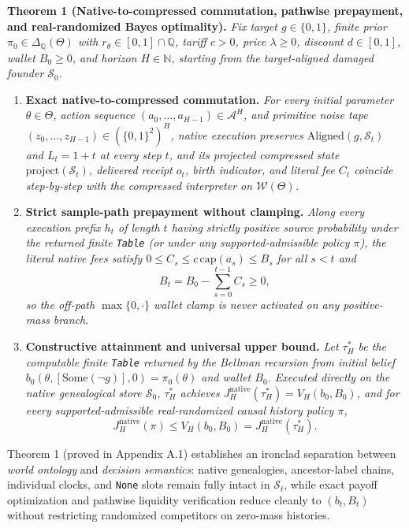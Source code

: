 \documentclass[11pt,a4paper]{article}
\providecommand{\tightlist}{\setlength{\itemsep}{2pt}\setlength{\parskip}{0pt}}
\begin{document}
\textbf{Theorem 1 (Native-to-compressed commutation, pathwise
prepayment, and real-randomized Bayes optimality).} \emph{Fix target
\(g \in \{0,1\}\), finite prior
\(\pi_0 \in \Delta_{\mathbb{Q}}(\Theta)\) with
\(r_\theta \in [0,1] \cap \mathbb{Q}\), tariff \(c > 0\), price
\(\lambda \ge 0\), discount \(d \in [0,1]\), wallet \(B_0 \ge 0\), and
horizon \(H \in \mathbb{N}\), starting from the target-aligned damaged
founder \(\mathcal{S}_0\).}

\begin{enumerate}
\def\labelenumi{\arabic{enumi}.}
\tightlist
\item
  \textbf{Exact native-to-compressed commutation.} \emph{For every
  initial parameter \(\theta \in \Theta\), action sequence
  \((a_0, \dots, a_{H-1}) \in \mathcal{A}^H\), and primitive noise tape
  \((z_0, \dots, z_{H-1}) \in (\{0,1\}^2)^H\), native execution
  preserves \(\mathrm{Aligned}(g, \mathcal{S}_t)\) and \(L_t = 1 + t\)
  at every step \(t\), and its projected compressed state
  \(\mathrm{project}(\mathcal{S}_t)\), delivered receipt \(o_t\), birth
  indicator, and literal fee \(C_t\) coincide step-by-step with the
  compressed interpreter on \(\mathcal{W}(\Theta)\).}
\item
  \textbf{Strict sample-path prepayment without clamping.} \emph{Along
  every execution prefix \(h_t\) of length \(t\) having strictly
  positive source probability under the returned finite \texttt{Table}
  (or under any supported-admissible policy \(\pi\)), the literal native
  fees satisfy \(0 \le C_s \le c\,\mathrm{cap}(a_s) \le B_s\) for all
  \(s < t\) and} \[B_t = B_0 - \sum_{s=0}^{t-1} C_s \ge 0,\] \emph{so
  the off-path \(\max\{0, \cdot\}\) wallet clamp is never activated on
  any positive-mass branch.}
\item
  \textbf{Constructive attainment and universal upper bound.} \emph{Let
  \(\tau_H^*\) be the computable finite \texttt{Table} returned by the
  Bellman recursion from initial belief
  \(b_0(\theta, [\mathrm{Some}(\neg g)], 0) = \pi_0(\theta)\) and wallet
  \(B_0\). Executed directly on the native genealogical store
  \(\mathcal{S}_0\), \(\tau_H^*\) achieves
  \(J_H^{\mathrm{native}}(\tau_H^*) = V_H(b_0, B_0)\), and for every
  supported-admissible real-randomized causal history policy \(\pi\),}
  \[J_H^{\mathrm{native}}(\pi) \le V_H(b_0, B_0) = J_H^{\mathrm{native}}(\tau_H^*).\]
\end{enumerate}

Theorem 1 (proved in Appendix A.1) establishes an ironclad separation
between \emph{world ontology} and \emph{decision semantics}: native
genealogies, ancestor-label chains, individual clocks, and \texttt{None}
slots remain fully intact in \(\mathcal{S}_t\), while exact payoff
optimization and pathwise liquidity verification reduce cleanly to
\((b_t, B_t)\) without restricting randomized competitors on zero-mass
histories.
\end{document}
